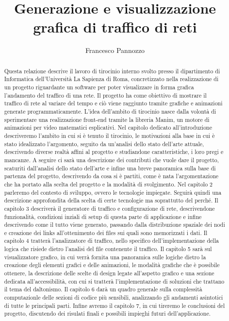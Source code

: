 \documentclass[binding=0.6cm]{sapthesis}
\title{Generazione e visualizzazione grafica di traffico di reti}
\author{Francesco Pannozzo}
\begin{document}
\frontmatter
\maketitle
\dedication{Dedicato alla\\ mia famiglia}
\begin{abstract}
Questa relazione descrive il lavoro di tirocinio interno svolto presso il dipartimento di Informatica dell'Università La Sapienza di Roma, 
concretizzato nella realizzazione 
di un progetto riguardante un software per poter visualizzare in forma grafica l'andamento 
del traffico di una rete.
Il progetto ha come obiettivo di mostrare il traffico di rete al variare del tempo e ciò viene raggiunto
tramite grafiche e animazioni generate programmaticamente. L'idea dell'ambito di tirocinio nasce 
dalla volontà di sperimentare una realizzazione front-end tramite la libreria Manim, un motore di animazioni per video
matematici esplicativi. Nel capitolo dedicato all'introduzione descriveremo l'ambito in cui si è tenuto il tirocinio, le motivazioni
alla base in cui è stato idealizzato l'argomento, seguito da un'analisi dello stato dell'arte attuale, descrivendo diverse realtà affini al progetto
e studiandone caratteristiche, i loro pregi e mancanze. A seguire ci sarà una descrizione dei contributi che vuole dare il progetto, scaturiti dall'analisi
dello stato dell'arte e infine una breve panoramica sulla base di partenza del progetto, descrivendo da cosa si è partiti, come è nata l'argomentazione
che ha portato alla scelta del progetto e la modalità di svolgimento. Nel capitolo 2 parleremo del contesto di sviluppo, ovvero le tecnologie impiegate.
Seguirà quindi una descrizione approfondita della scelta di certe tecnologie ma soprattutto del perché. Il capitolo 3
descriverà il generatore di traffico e configurazione di rete, descrivendone funzionalità, condizioni inziali di setup di questa parte di applicazione e infine
descrivendo come il tutto viene generato, passando dalla distribuzione spaziale dei nodi e creazione dei links all'ottenimento dei files sui quali sono memorizzati i dati.
Il capitolo 4 tratterà l'analizzatore di traffico, nello specifico dell'implementazione della logica che risiede dietro l'analisi del file contenente il traffico.
Il capitolo 5 sarà sul visualizzatore grafico, in cui verrà fornita una panoramica sulle logiche dietro la creazione degli elementi grafici e delle animazioni, le modalità
grafiche che è possibile ottenere, la descrizione delle scelte di design legate all'aspetto grafico e una sezione dedicata all'accessibilità, con cui si tratterà
l'implementazione di soluzioni che trattano il tema del daltonismo. Il capitolo 6 darà un quadro generale sulla complessità computazionle delle sezioni di codice più sensibili, analizzando gli andamenti asintotici di tutte le principali parti.
Infine avremo il capitolo 7, in cui tireremo le conclusioni del progetto, discutendo dei risulati finali e possibili impieghi futuri dell'applicazione.

\end{abstract}
\tableofcontents
\mainmatter
\end{document}
